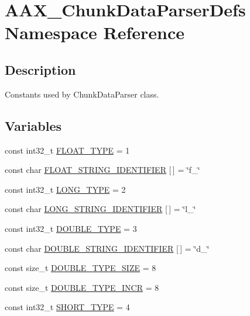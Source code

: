 \hypertarget{a00851}{}\section{A\+A\+X\+\_\+\+Chunk\+Data\+Parser\+Defs Namespace Reference}
\label{a00851}


\subsection{Description}
Constants used by Chunk\+Data\+Parser class. \subsection*{Variables}
\begin{DoxyCompactItemize}
\item 
const int32\+\_\+t \mbox{\hyperlink{a00851_ad5dab97f040a4e216054bec18a3a3848}{F\+L\+O\+A\+T\+\_\+\+T\+Y\+PE}} = 1
\item 
const char \mbox{\hyperlink{a00851_a8340a22e9392091da5acf3bbbea18fc6}{F\+L\+O\+A\+T\+\_\+\+S\+T\+R\+I\+N\+G\+\_\+\+I\+D\+E\+N\+T\+I\+F\+I\+ER}} \mbox{[}$\,$\mbox{]} = \char`\"{}f\+\_\+\char`\"{}
\item 
const int32\+\_\+t \mbox{\hyperlink{a00851_a228099aae2d4442465b8d8ba67d832c7}{L\+O\+N\+G\+\_\+\+T\+Y\+PE}} = 2
\item 
const char \mbox{\hyperlink{a00851_af53f70a76b16ae3e06cd38515f3842e1}{L\+O\+N\+G\+\_\+\+S\+T\+R\+I\+N\+G\+\_\+\+I\+D\+E\+N\+T\+I\+F\+I\+ER}} \mbox{[}$\,$\mbox{]} = \char`\"{}l\+\_\+\char`\"{}
\item 
const int32\+\_\+t \mbox{\hyperlink{a00851_a4724cff14c9b5d97bf3304247c717763}{D\+O\+U\+B\+L\+E\+\_\+\+T\+Y\+PE}} = 3
\item 
const char \mbox{\hyperlink{a00851_a9875551b1fa5760f6b6d4525d62d7ccc}{D\+O\+U\+B\+L\+E\+\_\+\+S\+T\+R\+I\+N\+G\+\_\+\+I\+D\+E\+N\+T\+I\+F\+I\+ER}} \mbox{[}$\,$\mbox{]} = \char`\"{}d\+\_\+\char`\"{}
\item 
const size\+\_\+t \mbox{\hyperlink{a00851_a485cccfc704f0da8c1d25aa0ba5723ab}{D\+O\+U\+B\+L\+E\+\_\+\+T\+Y\+P\+E\+\_\+\+S\+I\+ZE}} = 8
\item 
const size\+\_\+t \mbox{\hyperlink{a00851_aaa27d90baca7ee4caaeab126c56ff76f}{D\+O\+U\+B\+L\+E\+\_\+\+T\+Y\+P\+E\+\_\+\+I\+N\+CR}} = 8
\item 
const int32\+\_\+t \mbox{\hyperlink{a00851_a4e1dca1df2ca60f4325cddbbc7556121}{S\+H\+O\+R\+T\+\_\+\+T\+Y\+PE}} = 4
\item 

\end{DoxyCompactItemize}
